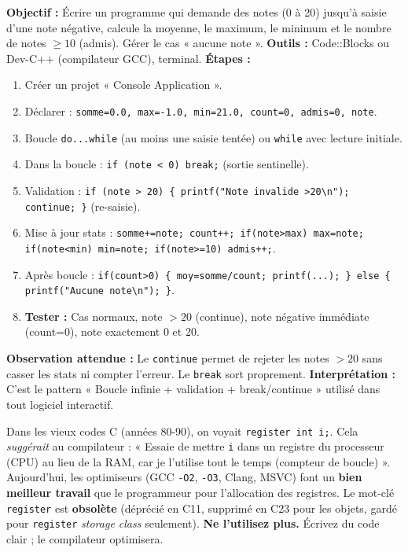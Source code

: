 \documentclass[11pt]{article}
\begin{document}
\begin{experience}
\textbf{Objectif :} Écrire un programme qui demande des notes (0 à 20) jusqu'à saisie d'une note négative, calcule la moyenne, le maximum, le minimum et le nombre de notes $\ge 10$ (admis). Gérer le cas « aucune note ».
\textbf{Outils :} Code::Blocks ou Dev-C++ (compilateur GCC), terminal.
\textbf{Étapes :}
\begin{enumerate}
    \item Créer un projet « Console Application ».
    \item Déclarer : \texttt{somme=0.0, max=-1.0, min=21.0, count=0, admis=0, note}.
    \item Boucle \texttt{do...while} (au moins une saisie tentée) ou \texttt{while} avec lecture initiale.
    \item Dans la boucle : \texttt{if (note < 0) break;} (sortie sentinelle).
    \item Validation : \texttt{if (note > 20) \{ printf("Note invalide >20\textbackslash n"); continue; \}} (re-saisie).
    \item Mise à jour stats : \texttt{somme+=note; count++; if(note>max) max=note; if(note<min) min=note; if(note>=10) admis++;}.
    \item Après boucle : \texttt{if(count>0) \{ moy=somme/count; printf(...); \} else \{ printf("Aucune note\textbackslash n"); \}}.
    \item \textbf{Tester :} Cas normaux, note $>20$ (continue), note négative immédiate (count=0), note exactement 0 et 20.
\end{enumerate}
\textbf{Observation attendue :} Le \texttt{continue} permet de rejeter les notes $>20$ sans casser les stats ni compter l'erreur. Le \texttt{break} sort proprement.
\textbf{Interprétation :} C'est le pattern « Boucle infinie + validation + break/continue » utilisé dans tout logiciel interactif.
\end{experience}

\begin{savaistu}
Dans les vieux codes C (années 80-90), on voyait \texttt{register int i;}. Cela \emph{suggérait} au compilateur : « Essaie de mettre \texttt{i} dans un registre du processeur (CPU) au lieu de la RAM, car je l'utilise tout le temps (compteur de boucle) ». Aujourd'hui, les optimiseurs (GCC \texttt{-O2}, \texttt{-O3}, Clang, MSVC) font un \textbf{bien meilleur travail} que le programmeur pour l'allocation des registres. Le mot-clé \texttt{register} est \textbf{obsolète} (déprécié en C11, supprimé en C23 pour les objets, gardé pour \texttt{register} \emph{storage class} seulement). \textbf{Ne l'utilisez plus.} Écrivez du code clair ; le compilateur optimisera.
\end{savaistu}
\end{document}
